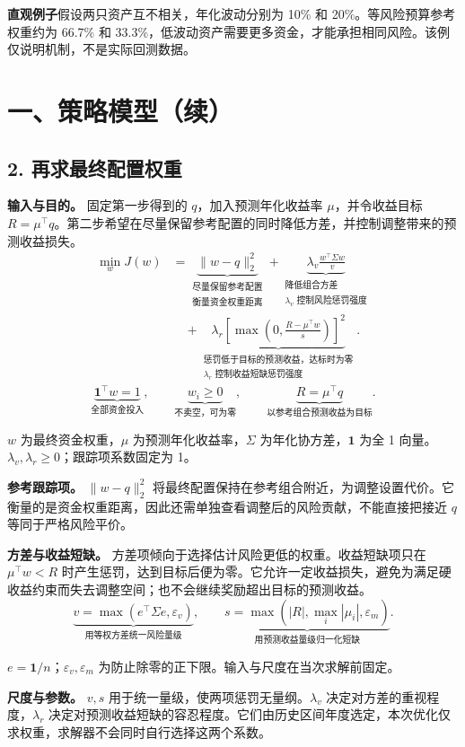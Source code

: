 \documentclass[UTF8,zihao=-4]{ctexart}
\newcommand{\note}[1]{{\small\color{softgray}#1\par}}
\newcommand{\askbox}[1]{\par\smallskip\colorbox{paleblue}{\parbox{\dimexpr\linewidth-2\fboxsep\relax}{\small #1}}\par}
\begin{document}
\askbox{\textbf{直观例子}\quad 假设两只资产互不相关，年化波动分别为 10\% 和 20\%。等风险预算参考权重约为 66.7\% 和 33.3\%，低波动资产需要更多资金，才能承担相同风险。该例仅说明机制，不是实际回测数据。}

\clearpage
\section*{一、策略模型（续）}
\subsection*{2. 再求最终配置权重}
\textbf{输入与目的。} 固定第一步得到的 $q$，加入预测年化收益率 $\mu$，并令收益目标 $R=\mu^\top q$。第二步希望在尽量保留参考配置的同时降低方差，并控制调整带来的预测收益损失。
\begin{align*}
 \min_w J(w)
 &=\underbrace{\|w-q\|_2^2}_{\substack{\text{尽量保留参考配置}\\\text{衡量资金权重距离}}}
 +\underbrace{\lambda_v\frac{w^\top\Sigma w}{v}}_{\substack{\text{降低组合方差}\\\lambda_v\text{ 控制风险惩罚强度}}}\\[0.3em]
 &\quad+\underbrace{\lambda_r\left[\max\left(0,\frac{R-\mu^\top w}{s}\right)\right]^2}_{\substack{\text{惩罚低于目标的预测收益，达标时为零}\\\lambda_r\text{ 控制收益短缺惩罚强度}}}.
\end{align*}
\[
 \underbrace{\mathbf1^\top w=1}_{\text{全部资金投入}},\qquad
 \underbrace{w_i\ge0}_{\text{不卖空，可为零}},\qquad
 \underbrace{R=\mu^\top q}_{\text{以参考组合预测收益为目标}}.
\]
\note{$w$ 为最终资金权重，$\mu$ 为预测年化收益率，$\Sigma$ 为年化协方差，$\mathbf1$ 为全 1 向量。$\lambda_v,\lambda_r\ge0$；跟踪项系数固定为 1。}
\textbf{参考跟踪项。} $\|w-q\|_2^2$ 将最终配置保持在参考组合附近，为调整设置代价。它衡量的是资金权重距离，因此还需单独查看调整后的风险贡献，不能直接把接近 $q$ 等同于严格风险平价。

\textbf{方差与收益短缺。} 方差项倾向于选择估计风险更低的权重。收益短缺项只在 $\mu^\top w<R$ 时产生惩罚，达到目标后便为零。它允许一定收益损失，避免为满足硬收益约束而失去调整空间；也不会继续奖励超出目标的预测收益。
\[
 \underbrace{v=\max(e^\top\Sigma e,\varepsilon_v)}_{\text{用等权方差统一风险量级}},\qquad
 \underbrace{s=\max(|R|,\max_i|\mu_i|,\varepsilon_m)}_{\text{用预测收益量级归一化短缺}}.
\]
\note{$e=\mathbf1/n$；$\varepsilon_v,\varepsilon_m$ 为防止除零的正下限。输入与尺度在当次求解前固定。}
\textbf{尺度与参数。} $v,s$ 用于统一量级，使两项惩罚无量纲。$\lambda_v$ 决定对方差的重视程度，$\lambda_r$ 决定对预测收益短缺的容忍程度。它们由历史区间年度选定，本次优化仅求权重，求解器不会同时自行选择这两个系数。
\end{document}
